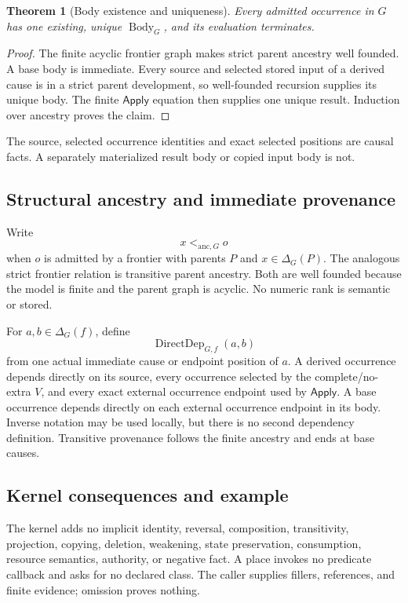 \documentclass[11pt,twoside]{article}
\newcommand{\Apply}{\mathsf{Apply}}
\newtheorem{theorem}{Theorem}
\begin{document}
\begin{theorem}[Body existence and uniqueness]\label{thm:body}
Every admitted occurrence in \(G\) has one existing, unique
\(\operatorname{Body}_G\), and its evaluation terminates.
\end{theorem}

\begin{proof}
The finite acyclic frontier graph makes strict parent ancestry well founded.  A
base body is immediate.  Every source and selected stored input of a derived cause
is in a strict parent development, so well-founded recursion supplies its unique
body.  The finite \(\Apply\) equation then supplies one unique result.  Induction
over ancestry proves the claim.
\end{proof}

The source, selected occurrence identities and exact selected positions are
causal facts.  A separately materialized result body or copied input body is not.

\subsection{Structural ancestry and immediate provenance}

Write
\[
  x<_{\mathrm{anc},G}o
\]
when \(o\) is admitted by a frontier with parents \(P\) and
\(x\in\Delta_G(P)\).  The analogous strict frontier relation is transitive parent
ancestry.  Both are well founded because the model is finite and the parent graph
is acyclic.  No numeric rank is semantic or stored.

For \(a,b\in\Delta_G(f)\), define
\[
  \operatorname{DirectDep}_{G,f}(a,b)
\]
from one actual immediate cause or endpoint position of \(a\).  A derived
occurrence depends directly on its source, every occurrence selected by the
complete/no-extra \(V\), and every exact external occurrence endpoint used by
\(\Apply\).  A base occurrence depends directly on each external occurrence
endpoint in its body.  Inverse notation may be used locally, but there is no second
dependency definition.  Transitive provenance follows the finite ancestry and
ends at base causes.

\subsection{Kernel consequences and example}

The kernel adds no implicit identity, reversal, composition, transitivity,
projection, copying, deletion, weakening, state preservation, consumption,
resource semantics, authority, or negative fact.  A place invokes no predicate
callback and asks for no declared class.  The caller supplies fillers, references,
and finite evidence; omission proves nothing.
\end{document}
